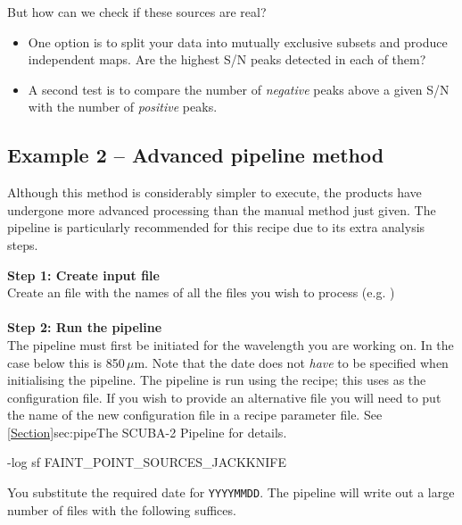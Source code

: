 \documentclass[11pt,oneside,chapters]{starlink}
\begin{document}
But how can we check if these sources are real?
\begin{itemize}

\item One option is to split your data into mutually exclusive subsets
  and produce independent maps. Are the highest S/N peaks detected in each of
  them?
\item A second test is to compare the number of \emph{negative} peaks above
  a given S/N with the number of \emph{positive} peaks.
\end{itemize}

\subsection{Example 2 -- Advanced pipeline method}
\label{sec:jk}

Although this method is considerably simpler to execute, the products
have undergone more advanced processing than the manual method just
given. The pipeline is particularly recommended for this recipe due to
its extra analysis steps.

\textbf{Step 1: Create input file}\\
Create an file with the names of all the files you wish to process (e.g.
)
\\ \\
\textbf{Step 2: Run the pipeline}\\
The pipeline must first be initiated for the wavelength you are
working on. In the case below this is 850\,$\mu$m. Note that the date
does not \emph{have} to be specified when initialising the pipeline.
The pipeline is run using the
recipe; this uses  as the
configuration file. If you wish to provide an alternative file you
will need to put the name of the new configuration file in a recipe
parameter file.  See \cref{Section}{sec:pipe}{The SCUBA-2 Pipeline}
for details.
\begin{terminalv}
-log sf FAINT_POINT_SOURCES_JACKKNIFE
\end{terminalv}

You substitute the required date for \texttt{YYYYMMDD}.
The pipeline will write out a large number of files with the following
suffices.
\end{document}
